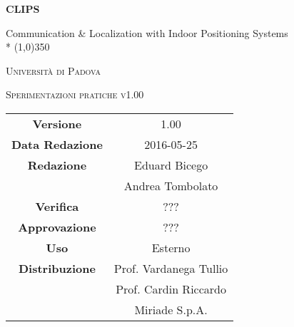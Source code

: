 \documentclass[a4paper,12pt]{article}
\author{}
\date{9/12/2015}
\begin{document}
	\begin{titlepage}
		\centering
		{\huge\bfseries CLIPS\par}
	Communication \& Localization with Indoor Positioning Systems \\*
	\line(1,0){350} \\
	{\scshape\LARGE Università di Padova \par}
	\vspace{1cm}
	{\scshape\Large Sperimentazioni pratiche v1.00\par}
	\logo
	\newpage
		\begin{tabular}{c|c}
			{\hfill \textbf{Versione}} 		& 1.00				\\
			{\hfill\textbf{Data Redazione}} 	& 2016-05-25	  		\\
			{\hfill\textbf{Redazione}}		& Eduard Bicego \\
											&  Andrea Tombolato 		\\
			{\hfill\textbf{Verifica}} 		& ???		\\
			{\hfill\textbf{Approvazione}} 		& ???		\\
			{\hfill\textbf{Uso}} 			& Esterno			\\
			{\hfill\textbf{Distribuzione}} 		& Prof. Vardanega Tullio 	\\
								& Prof. Cardin Riccardo 	\\
								& Miriade S.p.A. 		\\
		\end{tabular}
	\end{titlepage}
	\newpage
		\pagestyle{myfront}
		

	\newpage
		\tableofcontents
	\newpage
		\listoftables
	\newpage
		\listoffigures
	\label{LastFrontPage}

	\newpage
	\pagestyle{mymain}
				
		
	\newpage
		
		
	\newpage
		
	\newpage
		
	\newpage
		
		
	
	\newpage
		
		
	\newpage
		
		
	\label{LastPage}
\end{document}
